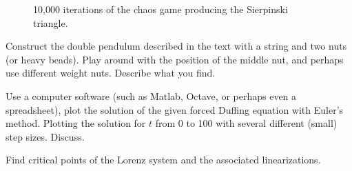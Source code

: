 \begin{figure}[h!t]
\capstart
\begin{center}
\caption{10,000 iterations of the chaos game producing the 
Sierpinski triangle. \label{nlin:sierpinski}}
\end{center}
\end{figure}

\begin{exercise}[project]
Construct the double pendulum described in the text with a string and two
nuts (or heavy beads).  Play around with the position of the middle nut, and
perhaps use different weight nuts.  Describe what you find.
\end{exercise}

\begin{exercise}
Use a computer software (such as Matlab, Octave, or
perhaps even a spreadsheet), plot the solution
of the given forced Duffing equation with Euler's method.  Plotting the
solution for $t$ from 0 to 100 with several different (small) step sizes.
Discuss.
\end{exercise}

\setcounter{exercise}{100}

\begin{exercise}
Find critical points of the Lorenz system and the associated linearizations.
\end{exercise}
